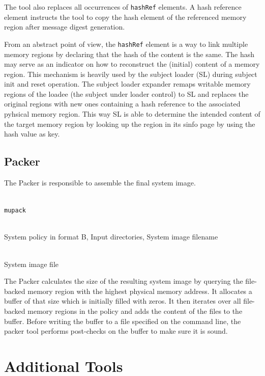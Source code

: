 \documentclass[a4paper,twoside,titlepage]{article}
\begin{document}
The tool also replaces all occurrences of \texttt{hashRef} elements. A hash
reference element instructs the tool to copy the hash element of the referenced
memory region after message digest generation.

From an abstract point of view, the \texttt{hashRef} element is a way to link
multiple memory regions by declaring that the hash of the content is the same.
The hash may serve as an indicator on how to reconstruct the (initial) content
of a memory region. This mechanism is heavily used by the subject loader (SL)
during subject init and reset operation. The subject loader expander remaps
writable memory regions of the loadee (the subject under loader control) to SL
and replaces the original regions with new ones containing a hash reference to
the associated pyhsical memory region. This way SL is able to determine the
intended content of the target memory region by looking up the region in its
sinfo page by using the hash value as key.

\subsection{Packer}
\label{sec:tools-packer}
The Packer is responsible to assemble the final system image.

\begin{description} \itemsep1pt \parskip0pt
	\item[Name] \hfill \\
		\texttt{mupack}
	\item[Input] \hfill \\
		System policy in format B, Input directories, System image filename
	\item[Output] \hfill \\
		System image file
\end{description}

The Packer calculates the size of the resulting system image by querying the
file-backed memory region with the highest physical memory address. It
allocates a buffer of that size which is initially filled with zeros. It then
iterates over all file-backed memory regions in the policy and adds the content
of the files to the buffer. Before writing the buffer to a file specified on
the command line, the packer tool performs post-checks on the buffer to make
sure it is sound.

\section{Additional Tools}
\label{sec:addtools}
\end{document}
